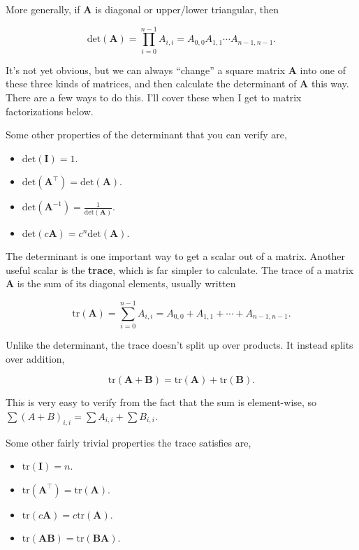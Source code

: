 \documentclass[
  letterpaper,
  DIV=11,
  numbers=noendperiod]{scrreprt}
\providecommand{\tightlist}{%
  \setlength{\itemsep}{0pt}\setlength{\parskip}{0pt}}\usepackage{longtable,booktabs,array}
\begin{document}
More generally, if \(\mathbf{A}\) is diagonal or upper/lower triangular,
then

\[\text{det}(\mathbf{A}) = \prod_{i=0}^{n-1} A_{i,i} = A_{0,0} A_{1,1} \cdots A_{n-1,n-1}.\]

It's not yet obvious, but we can always ``change'' a square matrix
\(\mathbf{A}\) into one of these three kinds of matrices, and then
calculate the determinant of \(\mathbf{A}\) this way. There are a few
ways to do this. I'll cover these when I get to matrix factorizations
below.

Some other properties of the determinant that you can verify are,

\begin{itemize}
\tightlist
\item
  \(\text{det}(\mathbf{I}) = 1\).
\item
  \(\text{det}(\mathbf{A}^\top) = \text{det}(\mathbf{A})\).
\item
  \(\text{det}(\mathbf{A}^{-1}) = \frac{1}{\text{det}(\mathbf{A})}\).
\item
  \(\text{det}(c\mathbf{A}) = c^n\text{det}(\mathbf{A})\).
\end{itemize}

The determinant is one important way to get a scalar out of a matrix.
Another useful scalar is the \textbf{trace}, which is far simpler to
calculate. The trace of a matrix \(\mathbf{A}\) is the sum of its
diagonal elements, usually written

\[\text{tr}(\mathbf{A}) = \sum_{i=0}^{n-1} A_{i,i} = A_{0,0} + A_{1,1} + \cdots + A_{n-1,n-1}.\]

Unlike the determinant, the trace doesn't split up over products. It
instead splits over addition,

\[\text{tr}(\mathbf{A} + \mathbf{B}) = \text{tr}(\mathbf{A}) + \text{tr}(\mathbf{B}).\]

This is very easy to verify from the fact that the sum is element-wise,
so \(\sum (A+B)_{i,i} = \sum A_{i,i} + \sum B_{i,i}\).

Some other fairly trivial properties the trace satisfies are,

\begin{itemize}
\tightlist
\item
  \(\text{tr}(\mathbf{I}) = n\).
\item
  \(\text{tr}(\mathbf{A}^\top) = \text{tr}(\mathbf{A})\).
\item
  \(\text{tr}(c\mathbf{A}) = c\text{tr}(\mathbf{A})\).
\item
  \(\text{tr}(\mathbf{A}\mathbf{B}) = \text{tr}(\mathbf{B}\mathbf{A})\).
\end{itemize}
\end{document}
